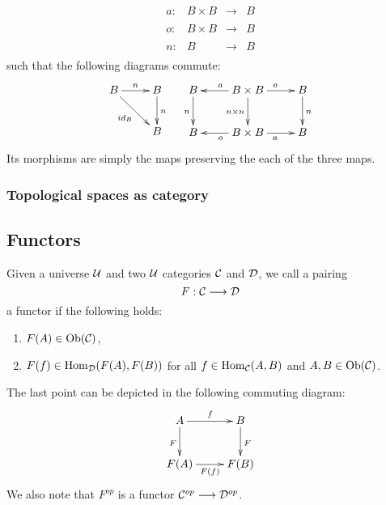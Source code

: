 \begin{enumerate}
$$\begin{array}{rrcl}
a : & B \times B & \longrightarrow& B\\
&&&\\
o : & B \times B & \longrightarrow& B\\
&&&\\
n : & B &\longrightarrow& B\\
\end{array}$$
such that the following diagrams commute:
$$\begin{array}{cc}
\xymatrix{
B \ar[rd]_{id_B}\ar[r]^n&B\ar[d]^n\\
&B\\
} &
\xymatrix{
B \ar[d]_n & B \times B \ar[l]_a \ar[r]^o \ar[d]_{n \times n} & B\ar[d]^n\\
B & B \times B \ar[l]^o \ar[r]_a &B\\
}\\
\end{array}$$
Its morphisms are simply the maps preserving the each of the three maps.
\end{enumerate}
\subsubsection{Topological spaces as category}

\subsection{Functors}
Given a universe $\mathcal{U}$ and two $\mathcal{U}$ categories $\mathcal{C}$ and $\mathcal{D}$, we call a pairing
$$F : \mathcal{C} \longrightarrow \mathcal{D}$$
a functor if the following holds:
\begin{enumerate}

\item $F(A) \in \mathrm{Ob}(\mathcal{C})$,
\item $F(f) \in \mathrm{Hom}_{\mathcal{D}}(F(A),F(B))$ for all $f \in \mathrm{Hom}_{\mathcal{C}}(A,B)$ and $A, B \in \mathrm{Ob}(\mathcal{C})$.
\end{enumerate}
The last point can be depicted in the following commuting diagram:
$$
\xymatrix{
A \ar[d]_F \ar[r]^f & B\ar[d]^F\\
F(A) \ar[r]_{F(f)} & F(B)\\
}
$$
We also note that $F^{op}$ is a functor $\mathcal{C}^{op} \longrightarrow \mathcal{D}^{op}$.
